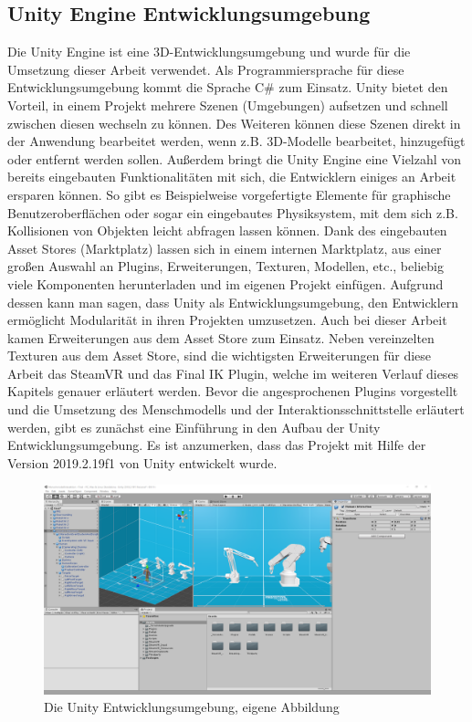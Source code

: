 \subsection{Unity Engine Entwicklungsumgebung}\label{sec:UnitEngine}
Die Unity Engine ist eine 3D-Entwicklungsumgebung und wurde für die Umsetzung dieser Arbeit verwendet. Als Programmiersprache für diese Entwicklungsumgebung kommt die Sprache C\# zum Einsatz. Unity bietet den Vorteil, in einem Projekt mehrere Szenen (Umgebungen) aufsetzen und schnell zwischen diesen wechseln zu können. Des Weiteren können diese Szenen direkt in der Anwendung bearbeitet werden, wenn z.B. 3D-Modelle bearbeitet, hinzugefügt oder entfernt werden sollen. Außerdem bringt die Unity Engine eine Vielzahl von bereits eingebauten Funktionalitäten mit sich, die Entwicklern einiges an Arbeit ersparen können. So gibt es Beispielweise vorgefertigte Elemente für graphische Benutzeroberflächen oder sogar ein eingebautes Physiksystem, mit dem sich z.B. Kollisionen von Objekten leicht abfragen lassen können. Dank des eingebauten Asset Stores (Marktplatz) lassen sich in einem internen Marktplatz, aus einer großen Auswahl an Plugins, Erweiterungen, Texturen, Modellen, etc., beliebig viele Komponenten herunterladen und im eigenen Projekt einfügen. Aufgrund dessen kann man sagen, dass Unity als Entwicklungsumgebung, den Entwicklern ermöglicht Modularität in ihren Projekten umzusetzen.
Auch bei dieser Arbeit kamen Erweiterungen aus dem Asset Store zum Einsatz. Neben vereinzelten Texturen aus dem Asset Store, sind die wichtigsten Erweiterungen für diese Arbeit das SteamVR und das Final IK Plugin, welche im weiteren Verlauf dieses Kapitels genauer erläutert werden.
\newline\newline
Bevor die angesprochenen Plugins vorgestellt und die Umsetzung des Menschmodells und der Interaktionsschnittstelle erläutert werden, gibt es zunächst eine Einführung in den Aufbau der Unity Entwicklungsumgebung. Es ist anzumerken, dass das Projekt mit Hilfe der Version 2019.2.19f1 von Unity entwickelt wurde.
\begin{figure}[h]
	\centering
	\includegraphics[width=1\linewidth]{Bilder/A47_UnityOverview}
	\caption{Die Unity Entwicklungsumgebung, eigene Abbildung}
	\label{fig:UnityOverview}
\end{figure}
